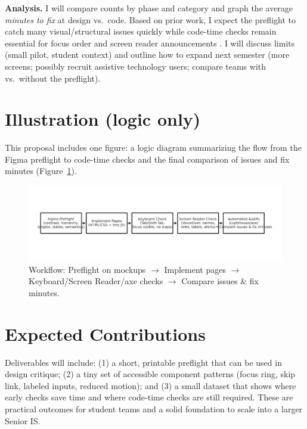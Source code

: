 \documentclass[12pt]{article}
\begin{document}
\textbf{Analysis.} I will compare counts by phase and category and graph the average \emph{minutes to fix} at design vs.\ code. Based on prior work, I expect the preflight to catch many visual/structural issues quickly while code-time checks remain essential for focus order and screen reader announcements \cite{huang2024a11yfigma, chen2024figmaapps, shi2023uxaccesspractice}. I will discuss limits (small pilot, student context) and outline how to expand next semester (more screens; possibly recruit assistive technology users; compare teams with vs.\ without the preflight).

\section*{Illustration (logic only)}
This proposal includes one figure: a logic diagram summarizing the flow from the Figma preflight to code-time checks and the final comparison of issues and fix minutes (Figure~\ref{fig:logic}).

\begin{figure}[h]
  \centering
 \includegraphics[width=0.95\linewidth]{imgs/logic-diagram.png}
  \caption{Workflow: Preflight on mockups $\rightarrow$ Implement pages $\rightarrow$ Keyboard/Screen Reader/axe checks $\rightarrow$ Compare issues \& fix minutes.}
  \label{fig:logic}
\end{figure}

\section*{Expected Contributions}
Deliverables will include: (1) a short, printable preflight that can be used in design critique; (2) a tiny set of accessible component patterns (focus ring, skip link, labeled inputs, reduced motion); and (3) a small dataset that shows where early checks save time and where code-time checks are still required. These are practical outcomes for student teams and a solid foundation to scale into a larger Senior IS.

\newpage
\end{document}
